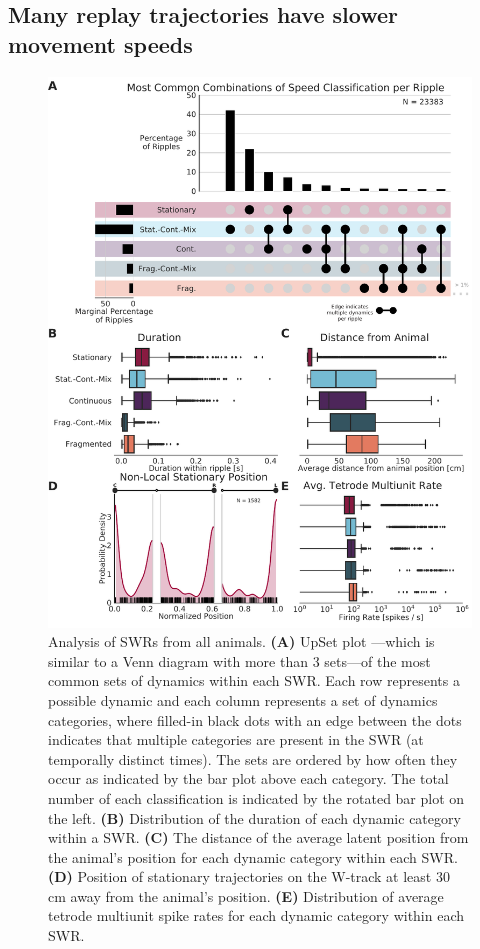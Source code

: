 \documentclass[times, twoside]{zHenriquesLab-StyleBioRxiv}
\begin{document}
\subsection*{Many replay trajectories have slower movement speeds}
\begin{figure}%
\centering
\includegraphics[width=0.80\linewidth]{figures/Figure5/Figure5_v4}
\caption{
Analysis of SWRs from all animals. \textbf{(A)} UpSet plot \cite{LexUpSetVisualizationIntersecting2014}---which is similar to a Venn diagram with more than 3 sets---of the most common sets of dynamics within each SWR. Each row represents a possible dynamic and each column represents a set of dynamics categories, where filled-in black dots with an edge between the dots indicates that multiple categories are present in the SWR (at temporally distinct times). The sets are ordered by how often they occur as indicated by the bar plot above each category. The total number of each classification is indicated by the rotated bar plot on the left. \textbf{(B)} Distribution of the duration of each dynamic category within a SWR. \textbf{(C)} The distance of the average latent position from the animal's position for each dynamic category within each SWR. \textbf{(D)} Position of stationary trajectories on the W-track at least 30 cm away from the animal's position. \textbf{(E)} Distribution of average tetrode multiunit spike rates for each dynamic category within each SWR.
}
\label{5}
\end{figure}
\end{document}
